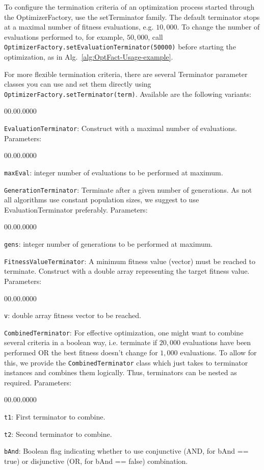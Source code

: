 To configure the termination criteria of an optimization process started
through the OptimizerFactory, use the setTerminator family. The default
terminator stops at a maximal number of fitness evaluations, e.g.
$10,000$. To change the number of evaluations performed to, for example,
$50,000$, call \texttt{Optim\-izer\-Fac\-tory.set\-Evaluation\-Ter\-mi\-na\-tor(50000)}
before starting the optimization, as in Alg.~\ref{alg:OptFact-Usage-example}.

For more flexible termination criteria, there are several Terminator
parameter classes you can use and set them directly using \texttt{Optim\-izer\-Fac\-tory.set\-Ter\-mi\-na\-tor(term)}.
Available are the following variants:
\begin{lyxlist}{00.00.0000}
\item [{\texttt{EvaluationTerminator}:}] Construct with a maximal number
of evaluations. Parameters: 

\begin{lyxlist}{00.00.0000}
\item [{\texttt{maxEval}:}] integer number of evaluations to be performed
at maximum.
\end{lyxlist}
\item [{\texttt{GenerationTerminator}:}] Terminate after a given number
of generations. As not all algorithms use constant population sizes,
we suggest to use EvaluationTerminator preferably. Parameters: 

\begin{lyxlist}{00.00.0000}
\item [{\texttt{gens}:}] integer number of generations to be performed
at maximum.
\end{lyxlist}
\item [{\texttt{FitnessValueTerminator}:}] A minimum fitness value (vector)
must be reached to terminate. Construct with a double array representing
the target fitness value. Parameters: 

\begin{lyxlist}{00.00.0000}
\item [{\texttt{v}:}] double array fitness vector to be reached.
\end{lyxlist}
\item [{\texttt{CombinedTerminator}:}] For effective optimization, one
might want to combine several criteria in a boolean way, i.e. terminate
if $20,000$ evaluations have been performed OR the best fitness doesn't
change for $1,000$ evaluations. To allow for this, we provide the
\texttt{CombinedTerminator} class which just takes to terminator instances
and combines them logically. Thus, terminators can be nested as required.
Parameters:

\begin{lyxlist}{00.00.0000}
\item [{\texttt{t1}:}] First terminator to combine.
\item [{\texttt{t2}:}] Second terminator to combine.
\item [{\texttt{bAnd}:}] Boolean flag indicating whether to use conjunctive
(AND, for bAnd == true) or disjunctive (OR, for bAnd == false) combination.
\end{lyxlist}
\end{lyxlist}
